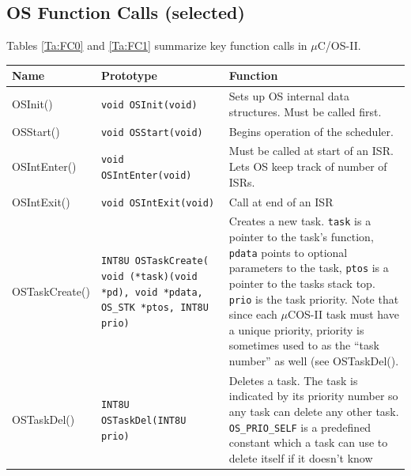 \subsection{OS Function Calls (selected)}

 Tables \ref{Ta:FC0} and \ref{Ta:FC1}	%
 summarize key function calls in $\mu$C/OS-II.	%


\begin{table}
\begin{center}
  \begin{tabular}{|l|p{1.6in}|p{2.75in} |}
  \hline
Name   &  Prototype  &  Function \\ \hline
 OSInit()       & {\tt void OSInit(void) }      & Sets up OS internal data
                                                  structures. Must be called first. \\ \hline
 OSStart()      & {\tt void OSStart(void) }     & Begins operation of the scheduler.\\ \hline
 OSIntEnter()   & {\tt void OSIntEnter(void)}   & Must be called at start of an ISR.
                                                  Lets OS keep track of number of ISRs. \\ \hline
 OSIntExit()    & {\tt void OSIntExit(void)}    & Call at end of an ISR
                                                  \\ \hline
 OSTaskCreate() & {\tt INT8U OSTaskCreate( void (*task)(void *pd), void *pdata, OS\_STK *ptos, INT8U prio) }
                & Creates a new task.
                 {\tt task} is a pointer to the task's function,
                 {\tt pdata} points to optional parameters to the task,
                 {\tt ptos} is a pointer to the tasks stack top.
                 {\tt prio} is the task priority.  Note that since each
                 $\mu$COS-II task must have a unique priority, priority is
                 sometimes used to as the ``task number'' as well (see
                 OSTaskDel().
                   \\ \hline
OSTaskDel()     & {\tt INT8U OSTaskDel(INT8U prio) }    &
                Deletes a task. The task is indicated by its priority
                number so any task can delete any other task.
                {\tt OS\_PRIO\_SELF} is a predefined constant
                which a task can use to delete itself if it doesn't know

\end{tabular}
\end{center}
\end{table}
